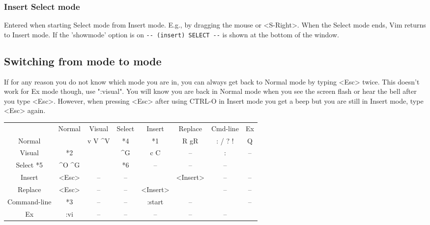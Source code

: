 \subsubsection{Insert Select mode}
Entered when starting Select mode from Insert mode.
E.g., by dragging the mouse or <S-Right>.
When the Select mode ends, Vim returns to Insert mode.
If the 'showmode' option is on \verb!-- (insert) SELECT --!
is shown at the bottom of the window.

\subsection{Switching from mode to mode}
\label{mode-switching}

If for any reason you do not know which mode you are in, you can always get back to Normal mode by typing <Esc> twice.
This doesn't work for Ex mode though, use ":visual".
You will know you are back in Normal mode when you see the screen flash or hear the bell after you type <Esc>.
However, when pressing <Esc> after using CTRL-O in Insert mode you get a beep but you are still in Insert mode, type <Esc> again.

\label{i_esc}
\begin{tabular}{c c c c c c c c}
				\backslashbox{FROM mode}{TO mode} & Normal & Visual                & Select & Insert   & Replace  & Cmd-line & Ex \\
				Normal                        &        & v       V       \textasciicircum V    & *4     & *1       & R gR     & : / ? !  & Q\\
				Visual                        & *2     &                       & \textasciicircum G     & c      C & --       & :        & --\\
				Select           *5     & \textasciicircum O                 \textasciicircum G &        & *6       & --       & --       & --\\
				Insert                            & <Esc>  & --                    & --     &          & <Insert> & --       & --\\
				Replace                           & <Esc>  & --                    & --     & <Insert> &          & --       & --\\
				Command-line                      & *3     & --                    & --     & :start   & --       &          & --\\
				Ex                                & :vi    & --                    & --     & --       & --       & --       & \\
\end{tabular}

